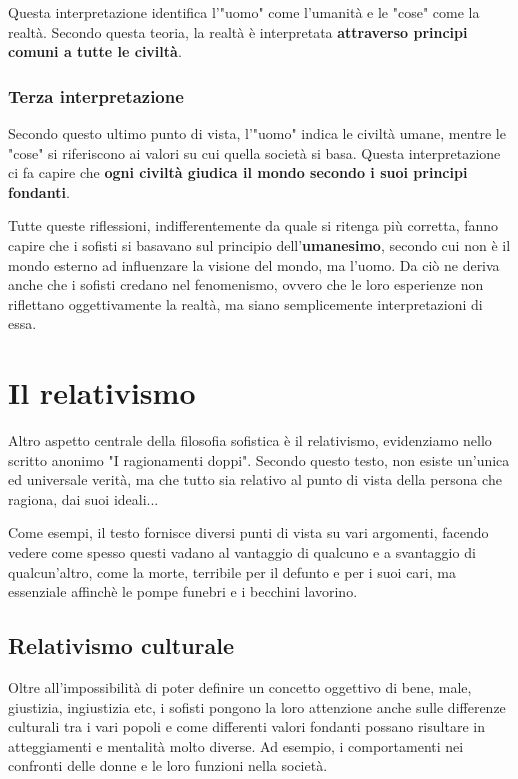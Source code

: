 \documentclass[10pt,a4paper]{article}
\begin{document}
	Questa interpretazione identifica l'"uomo" come l'umanità e le "cose" come la realtà. Secondo questa teoria, la realtà è interpretata \textbf{attraverso principi comuni a tutte le civiltà}.
	
	\subsubsection{Terza interpretazione}
	
	Secondo questo ultimo punto di vista, l'"uomo" indica le civiltà umane, mentre le "cose" si riferiscono ai valori su cui quella società si basa. Questa interpretazione ci fa capire che \textbf{ogni civiltà giudica il mondo secondo i suoi principi fondanti}.
	
	Tutte queste riflessioni, indifferentemente da quale si ritenga più corretta, fanno capire che i sofisti si basavano sul principio dell'\textbf{umanesimo}, secondo cui non è il mondo esterno ad influenzare la visione del mondo, ma l'uomo. Da ciò ne deriva anche che i sofisti credano nel fenomenismo, ovvero che le loro esperienze non riflettano oggettivamente la realtà, ma siano semplicemente interpretazioni di essa.
	
	\section{Il relativismo}
	
	Altro aspetto centrale della filosofia sofistica è il relativismo, evidenziamo nello scritto anonimo "I ragionamenti doppi". Secondo questo testo, non esiste un'unica ed universale verità, ma che tutto sia relativo al punto di vista della persona che ragiona, dai suoi ideali... 
	
	Come esempi, il testo fornisce diversi punti di vista su vari argomenti, facendo vedere come spesso questi vadano al vantaggio di qualcuno e a svantaggio di qualcun'altro, come la morte, terribile per il defunto e per i suoi cari, ma essenziale affinchè le pompe funebri e i becchini lavorino.
	
	\subsection{Relativismo culturale}
	
	Oltre all'impossibilità di poter definire un concetto oggettivo di bene, male, giustizia, ingiustizia etc, i sofisti pongono la loro attenzione anche sulle differenze culturali tra i vari popoli e come differenti valori fondanti possano risultare in atteggiamenti e mentalità molto diverse.  Ad esempio, i comportamenti nei confronti delle donne e le loro funzioni nella società.
	
\end{document}
